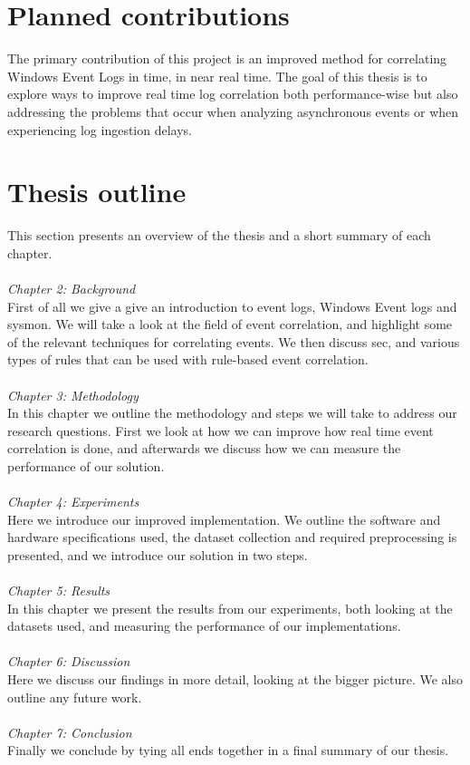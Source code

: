 \section{Planned contributions}
\label{sec:plannedcontributions}

The primary contribution of this project is an improved method for correlating Windows Event Logs in time, in near real time. The goal of this thesis is to explore ways to improve real time log correlation both performance-wise but also addressing the problems that occur when analyzing asynchronous events or when experiencing log ingestion delays.

\section{Thesis outline}
\label{sec:thesisoutline}
This section presents an overview of the thesis and a short summary of each chapter.\\\\
\textit{Chapter 2: Background}\\
First of all we give a give an introduction to event logs, Windows Event logs and \acrfull{sysmon}. We will take a look at the field of event correlation, and highlight some of the relevant techniques for correlating events. We then discuss \acrfull{sec}, and various types of rules that can be used with rule-based event correlation.\\\\
\textit{Chapter 3: Methodology}\\
In this chapter we outline the methodology and steps we will take to address our research questions. First we look at how we can improve how real time event correlation is done, and afterwards we discuss how we can measure the performance of our solution.\\\\
\textit{Chapter 4: Experiments}\\
Here we introduce our improved implementation. We outline the software and hardware specifications used, the dataset collection and required preprocessing is presented, and we introduce our solution in two steps.\\\\
\textit{Chapter 5: Results}\\
In this chapter we present the results from our experiments, both looking at the datasets used, and measuring the performance of our implementations.\\\\
\textit{Chapter 6: Discussion}\\
Here we discuss our findings in more detail, looking at the bigger picture. We also outline any future work.\\\\
\textit{Chapter 7: Conclusion}\\
Finally we conclude by tying all ends together in a final summary of our thesis.